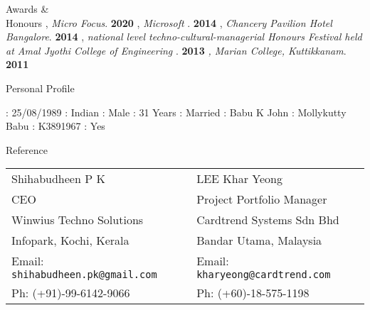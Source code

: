 \documentclass{resume}
\begin{document}

\begin{category}{Awards \&\\ Honours}
 , {\em
    Micro Focus}. \hfill \textbf{2020}
, {\em
    Microsoft }. \hfill \textbf{2014}
, {\em
    Chancery Pavilion Hotel Bangalore}. \hfill \textbf{2014}
  , {\em national level techno-cultural-managerial Honours Festival held at Amal Jyothi College of Engineering }. \hfill \textbf{2013}
   {\em , Marian College, Kuttikkanam}. \hfill \textbf{2011}
\end{category}


\begin{category}{Personal Profile}
 
           :   25/08/1989 
             :   Indian 
                  :   Male 
                     :   31 Years 
          :   Married 
           :   Babu K John 
           :   Mollykutty Babu 
         :   K3891967
     :   Yes
\end{category}




\begin{category}{Reference}
  \citemnobullet \\
  \begin{tabular}{ll}Shihabudheen P K& LEE Khar Yeong\\
    CEO& Project Portfolio Manager\\
    Winwius Techno Solutions&Cardtrend Systems Sdn Bhd\\
    Infopark, Kochi, Kerala& Bandar Utama, Malaysia\\
    Email: \mbox{\small\tt shihabudheen.pk@gmail.com}&Email: \mbox{\small\tt kharyeong@cardtrend.com}\\
    Ph: (+91)-99-6142-9066&Ph: (+60)-18-575-1198
  \end{tabular}
\end{category}
\end{document}
